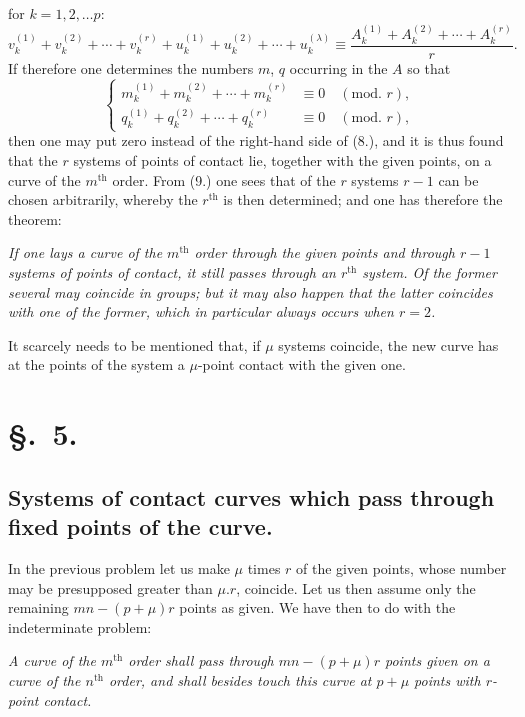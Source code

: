 \documentclass{article}
\begin{document}
for $k = 1, 2, \ldots p$:
\[ v_{k}^{(1)} + v_{k}^{(2)} + \cdots + v_{k}^{(r)} + u_{k}^{(1)} + u_{k}^{(2)} + \cdots + u_{k}^{(\lambda)} \equiv \frac{A_{k}^{(1)} + A_{k}^{(2)} + \cdots + A_{k}^{(r)}}{r}. \tag{8.} \]
If therefore one determines the numbers $m$, $q$ occurring in the $A$ so that
\[
\left\{
\begin{aligned}
m_{k}^{(1)} + m_{k}^{(2)} + \cdots + m_{k}^{(r)} &\equiv 0 \quad (\text{mod. } r), \\
q_{k}^{(1)} + q_{k}^{(2)} + \cdots + q_{k}^{(r)} &\equiv 0 \quad (\text{mod. } r),
\end{aligned}
\right.
\tag{9.}
\]
then one may put zero instead of the right-hand side of (8.), and it is thus found that the $r$ systems of points of contact lie, together with the given points, on a curve of the $m^{\text{th}}$ order. From (9.) one sees that of the $r$ systems $r-1$ can be chosen arbitrarily, whereby the $r^{\text{th}}$ is then determined; and one has therefore the theorem:

\emph{If one lays a curve of the $m^{\text{th}}$ order through the given points and through $r-1$ systems of points of contact, it still passes through an $r^{\text{th}}$ system. Of the former several may coincide in groups; but it may also happen that the latter coincides with one of the former, which in particular always occurs when $r = 2$.}

It scarcely needs to be mentioned that, if $\mu$ systems coincide, the new curve has at the points of the system a $\mu$-point contact with the given one.

\section*{§.~5.}
\subsection*{Systems of contact curves which pass through fixed points of the curve.}

In the previous problem let us make $\mu$ times $r$ of the given points, whose number may be presupposed greater than $\mu.r$, coincide. Let us then assume only the remaining $mn - (p+\mu)r$ points as given. We have then to do with the indeterminate problem:

\emph{A curve of the $m^{\text{th}}$ order shall pass through $mn - (p+\mu)r$ points given on a curve of the $n^{\text{th}}$ order, and shall besides touch this curve at $p+\mu$ points with $r$-point contact.}
\end{document}
